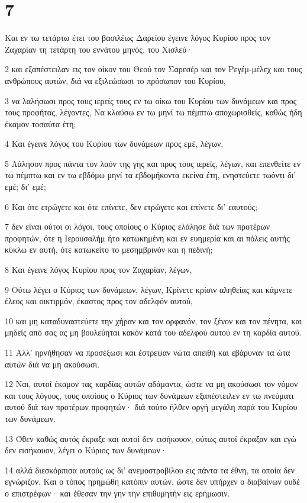 \chapter{7}

\par Και εν τω τετάρτω έτει του βασιλέως Δαρείου έγεινε λόγος Κυρίου προς τον Ζαχαρίαν τη τετάρτη του εννάτου μηνός, του Χισλεύ·
\par 2 και εξαπέστειλαν εις τον οίκον του Θεού τον Σαρεσέρ και τον Ρεγέμ-μέλεχ και τους ανθρώπους αυτών, διά να εξιλεώσωσι το πρόσωπον του Κυρίου,
\par 3 να λαλήσωσι προς τους ιερείς τους εν τω οίκω του Κυρίου των δυνάμεων και προς τους προφήτας, λέγοντες, Να κλαύσω εν τω μηνί τω πέμπτω αποχωρισθείς, καθώς ήδη έκαμον τοσαύτα έτη;
\par 4 Και έγεινε λόγος του Κυρίου των δυνάμεων προς εμέ, λέγων,
\par 5 Λάλησον προς πάντα τον λαόν της γης και προς τους ιερείς, λέγων, και επενθείτε εν τω πέμπτω και εν τω εβδόμω μηνί τα εβδομήκοντα εκείνα έτη, ενηστεύετε τωόντι δι' εμέ; δι' εμέ;
\par 6 Και ότε ετρώγετε και ότε επίνετε, δεν ετρώγετε και επίνετε δι' εαυτούς;
\par 7 δεν είναι ούτοι οι λόγοι, τους οποίους ο Κύριος ελάλησε διά των προτέρων προφητών, ότε η Ιερουσαλήμ ήτο κατωκημένη και εν ευημερία και αι πόλεις αυτής κύκλω εν αυτή, ότε κατωκείτο το μεσημβρινόν και η πεδινή;
\par 8 Και έγεινε λόγος Κυρίου προς τον Ζαχαρίαν, λέγων,
\par 9 Ούτω λέγει ο Κύριος των δυνάμεων, λέγων, Κρίνετε κρίσιν αληθείας και κάμνετε έλεος και οικτιρμόν, έκαστος προς τον αδελφόν αυτού,
\par 10 και μη καταδυναστεύετε την χήραν και τον ορφανόν, τον ξένον και τον πένητα, και μηδείς από σας ας μη βουλεύηται κακόν κατά του αδελφού αυτού εν τη καρδία αυτού.
\par 11 Αλλ' ηρνήθησαν να προσέξωσι και έστρεψαν νώτα απειθή και εβάρυναν τα ώτα αυτών διά να μη ακούσωσι.
\par 12 Ναι, αυτοί έκαμον τας καρδίας αυτών αδάμαντα, ώστε να μη ακούσωσι τον νόμον και τους λόγους, τους οποίους ο Κύριος των δυνάμεων εξαπέστειλεν εν τω πνεύματι αυτού διά των προτέρων προφητών· διά τούτο ήλθεν οργή μεγάλη παρά του Κυρίου των δυνάμεων.
\par 13 Όθεν καθώς αυτός έκραξε και αυτοί δεν εισήκουον, ούτως αυτοί έκραξαν και εγώ δεν εισήκουον, λέγει ο Κύριος των δυνάμεων·
\par 14 αλλά διεσκόρπισα αυτούς ως δι' ανεμοστροβίλου εις πάντα τα έθνη, τα οποία δεν εγνώριζον. Και ο τόπος ηρημώθη κατόπιν αυτών, ώστε δεν υπήρχεν ο διαβαίνων ουδέ ο επιστρέφων· και έθεσαν την γην την επιθυμητήν εις ερήμωσιν.

